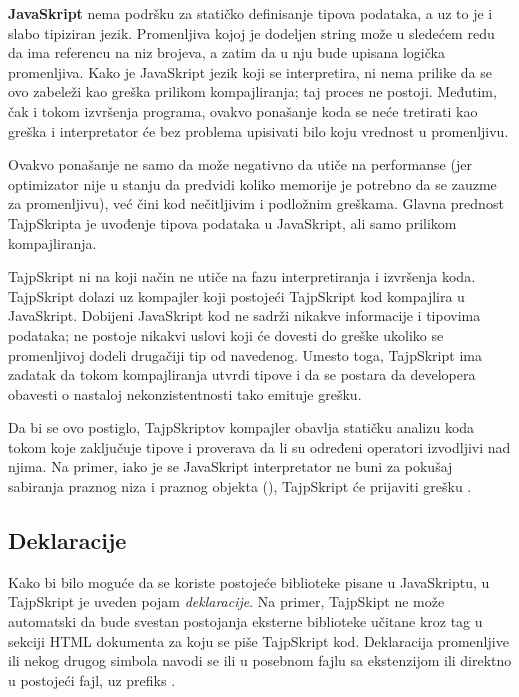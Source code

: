 \textbf{JavaSkript} nema podršku za statičko definisanje tipova podataka, a uz to je i slabo tipiziran jezik.
Promenljiva kojoj je dodeljen string može u sledećem redu da ima referencu na niz brojeva, a zatim da u nju bude upisana logička promenljiva.
Kako je JavaSkript jezik koji se interpretira, ni nema prilike da se ovo zabeleži kao greška prilikom kompajliranja; taj proces ne postoji.
Međutim, čak i tokom izvršenja programa, ovakvo ponašanje koda se neće tretirati kao greška i interpretator će bez problema upisivati bilo koju vrednost u promenljivu.

Ovakvo ponašanje ne samo da može negativno da utiče na performanse (jer optimizator nije u stanju da predvidi koliko memorije je potrebno da se zauzme za promenljivu), već čini kod nečitljivim i podložnim greškama.
Glavna prednost TajpSkripta je uvođenje tipova podataka u JavaSkript, ali samo prilikom kompajliranja.

TajpSkript ni na koji način ne utiče na fazu interpretiranja i izvršenja koda.
TajpSkript dolazi uz kompajler koji postojeći TajpSkript kod kompajlira u JavaSkript.
Dobijeni JavaSkript kod ne sadrži nikakve informacije i tipovima podataka; ne postoje nikakvi uslovi koji će dovesti do greške ukoliko se promenljivoj dodeli drugačiji tip od navedenog.
Umesto toga, TajpSkript ima zadatak da tokom kompajliranja utvrdi tipove i da se postara da developera obavesti o nastaloj nekonzistentnosti tako emituje grešku.

Da bi se ovo postiglo, TajpSkriptov kompajler obavlja statičku analizu koda tokom koje zaključuje tipove i proverava da li su određeni operatori izvodljivi nad njima.
Na primer, iako je se JavaSkript interpretator ne buni za pokušaj sabiranja praznog niza i praznog objekta (\code{[] + \{\}}), TajpSkript će prijaviti grešku .

\subsection{Deklaracije}

Kako bi bilo moguće da se koriste postojeće biblioteke pisane u JavaSkriptu, u TajpSkript je uveden pojam \textit{deklaracije}.
Na primer, TajpSkipt ne može automatski da bude svestan postojanja eksterne biblioteke učitane kroz  tag u  sekciji HTML dokumenta za koju se piše TajpSkript kod.
Deklaracija promenljive ili nekog drugog simbola navodi se ili u posebnom fajlu sa ekstenzijom  ili direktno u postojeći fajl, uz prefiks .

